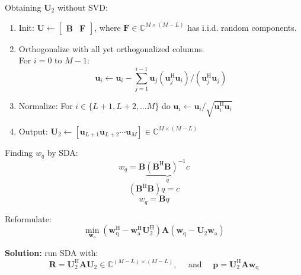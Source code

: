 \documentclass[english]{latex4ei/latex4ei_sheet}
\begin{document}
\begin{sectionbox}
  Obtaining $\boldsymbol{U}_{2}$ without SVD:
  \begin{enumerate}
    \item Init: $\boldsymbol{U} \leftarrow\left[\begin{array}{ll}\boldsymbol{B} & \boldsymbol{F}\end{array}\right]$, where $\boldsymbol{F} \in \mathbb{C}^{M \times(M-L)}$ has i.i.d. random components.
    \item Orthogonalize with all yet orthogonalized columns.\\For $i=0$ to $M-1$:
    $$\boldsymbol{u}_{i} \leftarrow \boldsymbol{u}_{i}-\sum_{j=1}^{i-1} \boldsymbol{u}_{j}\left(\boldsymbol{u}_{j}^{\mathrm{H}} \boldsymbol{u}_{i}\right) /\left(\boldsymbol{u}_{j}^{\mathrm{H}} \boldsymbol{u}_{j}\right)$$
    \item Normalize: For $i \in\{L+1, L+2, \ldots M\}$ do $\boldsymbol{u}_{i} \leftarrow \boldsymbol{u}_{i} / \sqrt{\boldsymbol{u}_{i}^{\mathrm{H}} \boldsymbol{u}_{i}}$
    \item Output: $\boldsymbol{U}_{2} \leftarrow\left[\boldsymbol{u}_{L+1} \boldsymbol{u}_{L+2} \cdots \boldsymbol{u}_{M}\right] \in \mathbb{C}^{M \times(M-L)}$
  \end{enumerate}
  \vspace{0.2cm}
  Finding $w_q$ by SDA:\\
  $$w_{q}=\boldsymbol{B} \underbrace{\left(\boldsymbol{B}^{\mathrm{H}} \boldsymbol{B}\right)^{-1} c}_{q}$$
  $$\left(\boldsymbol{B}^{\mathrm{H}} \boldsymbol{B}\right) q=c$$
  $$w_{q}=\boldsymbol{B} q$$

  Reformulate:\\
  $$\min _{\boldsymbol{w}_{\mathrm{a}}}\left(\boldsymbol{w}_{\mathrm{q}}^{\mathrm{H}}-\boldsymbol{w}_{\mathrm{a}}^{\mathrm{H}} \boldsymbol{U}_{2}^{\mathrm{H}}\right) \boldsymbol{A}\left(\boldsymbol{w}_{\mathrm{q}}-\boldsymbol{U}_{2} \boldsymbol{w}_{\mathrm{a}}\right)$$

  \textbf{Solution:} run SDA with:\\
  $$\boldsymbol{R}=\boldsymbol{U}_{2}^{\mathrm{H}} \boldsymbol{A} \boldsymbol{U}_{2} \in \mathbb{C}^{(M-L) \times(M-L)}, \quad \text { and } \quad \boldsymbol{p}=\boldsymbol{U}_{2}^{\mathrm{H}} \boldsymbol{A} \boldsymbol{w}_{\mathrm{q}}$$
\end{sectionbox}
\end{document}
